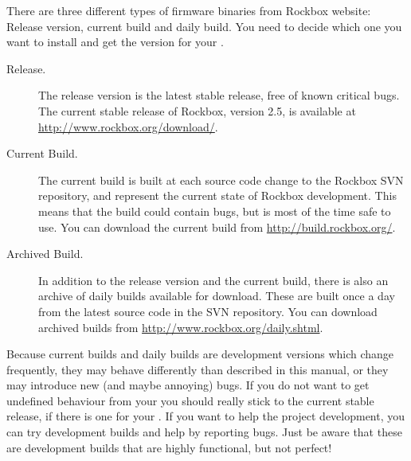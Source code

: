 There are three different types of firmware binaries from Rockbox website:
\label{Version}
Release version, current build and daily build. You need to decide which one
you want to install and get the version for your \dap{}.

\begin{description}

\item[Release.] The release version is the latest stable release, free
  of known critical bugs. The current stable release of Rockbox, version 2.5,
  is available at \url{http://www.rockbox.org/download/}.

\item[Current Build.] The current build is built at each source code change to
  the Rockbox SVN repository, and represent the current state of Rockbox
  development. This means that the build could contain bugs, but is most of
  the time safe to use. You can download the current build from  
  \url{http://build.rockbox.org/}.

\item[Archived Build.] In addition to the release version and the current build,
  there is also an archive of daily builds available for download. These are
  built once a day from the latest source code in the SVN repository. You can
  download archived builds from \url{http://www.rockbox.org/daily.shtml}.

\end{description}


Because current builds and daily builds are development versions which change
frequently, they may behave differently than described in this manual, or
they may introduce new (and maybe annoying) bugs. If you do not want to get
undefined behaviour from your \dap{} you should really stick to the current
stable release, if there is one for your \dap{}. If you want to help the
project development, you can try development builds and help by reporting
bugs. Just be aware that these are development builds that are highly
functional, but not perfect!

